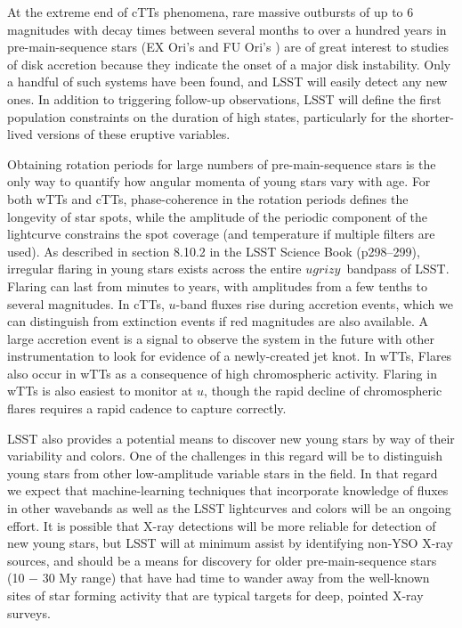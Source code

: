 At the extreme end of cTTs phenomena, rare massive
outbursts of up to 6 magnitudes with decay times between several months
to over a hundred years in pre-main-sequence stars (EX Ori's \citep{herbig01}
and FU Ori's \citep{hartmann96})
are of great interest to studies of disk accretion because they indicate the onset of
a major disk instability. Only a handful of such systems have been found, and LSST
will easily detect any new ones.  In addition to triggering
follow-up observations, LSST will define the first population
constraints on the duration of high states, particularly for the shorter-lived
versions of these eruptive variables.  

Obtaining rotation periods for large numbers of pre-main-sequence stars is the only way to
quantify how angular momenta of young stars vary with age. For both wTTs and cTTs,
phase-coherence in the rotation periods defines the longevity of star spots, while the
amplitude of the periodic component of the lightcurve constrains the spot coverage (and
temperature if multiple filters are used).  As described in section 8.10.2 in the
LSST Science Book (p298--299), irregular flaring in young stars exists across the entire
$ugrizy$~bandpass of LSST. Flaring can last from minutes to years, with
amplitudes from a few tenths to several magnitudes.  In cTTs, $u$-band fluxes rise during
accretion events, which we can distinguish from extinction events if red magnitudes are
also available. A large accretion event is a signal to observe the system
in the future with other instrumentation to look for evidence of a newly-created
jet knot. In wTTs, Flares also occur in wTTs as a consequence of high chromospheric activity.
Flaring in wTTs is also easiest to monitor at $u$, though the rapid decline of
chromospheric flares requires a rapid cadence to capture correctly.

LSST also provides a potential means to discover new young stars by way of
their variability and colors. One of the challenges in this regard will be to
distinguish young stars from other low-amplitude variable stars in the field.
In that regard we expect that machine-learning techniques that incorporate knowledge of
fluxes in other wavebands as well as the LSST lightcurves and colors will
be an ongoing effort. It is possible that X-ray detections will be more
reliable for detection of new young stars, but LSST will at minimum assist
by identifying non-YSO X-ray sources, and should be a means for discovery
for older pre-main-sequence stars (10 $-$ 30 My range) that have had time
to wander away from the well-known sites of star forming activity that are
typical targets for deep, pointed X-ray surveys.


